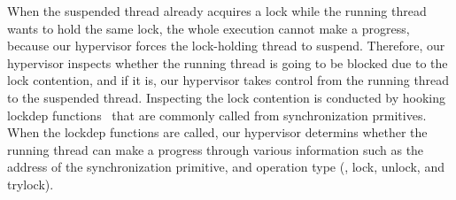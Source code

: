 When the suspended thread already acquires a lock while the running
thread wants to hold the same lock, the whole execution cannot make a
progress, because our hypervisor forces the lock-holding thread to
suspend.
%
Therefore, our hypervisor inspects whether the running thread is going
to be blocked due to the lock contention, and if it is, our hypervisor
takes control from the running thread to the suspended thread.
%
Inspecting the lock contention is conducted by hooking lockdep
functions~\cite{lockdep} that are commonly called from synchronization
prmitives.
%
When the lockdep functions are called, our hypervisor determins
whether the running thread can make a progress through various
information such as the address of the synchronization primitive, and
operation type (\ie, lock, unlock, and trylock).


